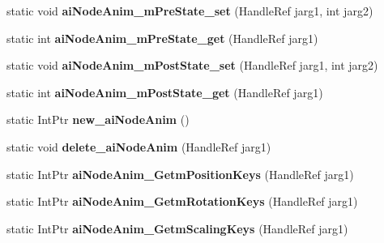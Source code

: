 \begin{DoxyCompactItemize}
\item 
\hypertarget{class_assimp_p_i_n_v_o_k_e_af370b7962bbe25f719d94d3290180424}{static void {\bfseries ai\+Node\+Anim\+\_\+m\+Pre\+State\+\_\+set} (Handle\+Ref jarg1, int jarg2)}\label{class_assimp_p_i_n_v_o_k_e_af370b7962bbe25f719d94d3290180424}

\item 
\hypertarget{class_assimp_p_i_n_v_o_k_e_aadfcb30ea6b92c025227090ad8d30c50}{static int {\bfseries ai\+Node\+Anim\+\_\+m\+Pre\+State\+\_\+get} (Handle\+Ref jarg1)}\label{class_assimp_p_i_n_v_o_k_e_aadfcb30ea6b92c025227090ad8d30c50}

\item 
\hypertarget{class_assimp_p_i_n_v_o_k_e_a8a420bd57528880d5a737182ad4e4e11}{static void {\bfseries ai\+Node\+Anim\+\_\+m\+Post\+State\+\_\+set} (Handle\+Ref jarg1, int jarg2)}\label{class_assimp_p_i_n_v_o_k_e_a8a420bd57528880d5a737182ad4e4e11}

\item 
\hypertarget{class_assimp_p_i_n_v_o_k_e_a3f8ccc51a0eea356e960aa0fce14ae18}{static int {\bfseries ai\+Node\+Anim\+\_\+m\+Post\+State\+\_\+get} (Handle\+Ref jarg1)}\label{class_assimp_p_i_n_v_o_k_e_a3f8ccc51a0eea356e960aa0fce14ae18}

\item 
\hypertarget{class_assimp_p_i_n_v_o_k_e_af53b0607d5c41a3839326ba786c098c1}{static Int\+Ptr {\bfseries new\+\_\+ai\+Node\+Anim} ()}\label{class_assimp_p_i_n_v_o_k_e_af53b0607d5c41a3839326ba786c098c1}

\item 
\hypertarget{class_assimp_p_i_n_v_o_k_e_a9fd935d81aa62ba3972d08fe64b0d2de}{static void {\bfseries delete\+\_\+ai\+Node\+Anim} (Handle\+Ref jarg1)}\label{class_assimp_p_i_n_v_o_k_e_a9fd935d81aa62ba3972d08fe64b0d2de}

\item 
\hypertarget{class_assimp_p_i_n_v_o_k_e_a87eddc301f69dc380c31f580ab797e93}{static Int\+Ptr {\bfseries ai\+Node\+Anim\+\_\+\+Getm\+Position\+Keys} (Handle\+Ref jarg1)}\label{class_assimp_p_i_n_v_o_k_e_a87eddc301f69dc380c31f580ab797e93}

\item 
\hypertarget{class_assimp_p_i_n_v_o_k_e_a16d16a3f0c99fefcf339980e3c1a1e4c}{static Int\+Ptr {\bfseries ai\+Node\+Anim\+\_\+\+Getm\+Rotation\+Keys} (Handle\+Ref jarg1)}\label{class_assimp_p_i_n_v_o_k_e_a16d16a3f0c99fefcf339980e3c1a1e4c}

\item 
\hypertarget{class_assimp_p_i_n_v_o_k_e_a8701e62fa28812480cd2f86863955545}{static Int\+Ptr {\bfseries ai\+Node\+Anim\+\_\+\+Getm\+Scaling\+Keys} (Handle\+Ref jarg1)}\label{class_assimp_p_i_n_v_o_k_e_a8701e62fa28812480cd2f86863955545}


\end{DoxyCompactItemize}
